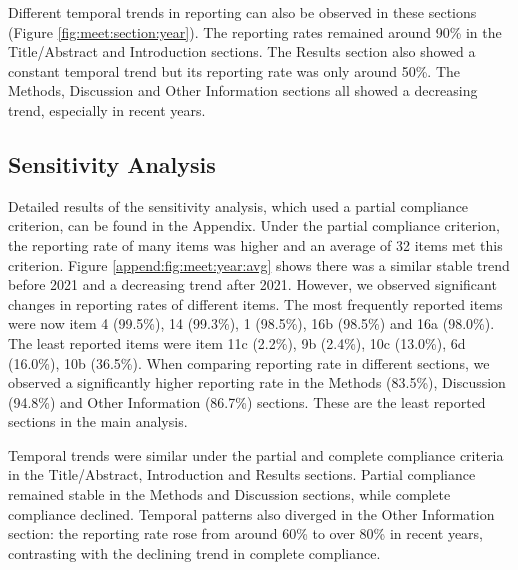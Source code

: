 Different temporal trends in reporting can also be observed in these sections (Figure \ref{fig:meet:section:year}). The reporting rates remained around 90\% in the Title/Abstract and Introduction sections. The Results section also showed a constant temporal trend but its reporting rate was only around 50\%. The Methods, Discussion and Other Information sections all showed a decreasing trend, especially in recent years.



\subsection{Sensitivity Analysis}

Detailed results of the sensitivity analysis, which used a partial compliance criterion, can be found in the Appendix. Under the partial compliance criterion, the reporting rate of many items was higher and an average of 32 items met this criterion. Figure \ref{append:fig:meet:year:avg} shows there was a similar stable trend before 2021 and a decreasing trend after 2021. However, we observed significant changes in reporting rates of different items. The most frequently reported items were now item 4 (99.5\%), 14 (99.3\%), 1 (98.5\%), 16b (98.5\%) and 16a (98.0\%). The least reported items were item 11c (2.2\%), 9b (2.4\%), 10c (13.0\%), 6d (16.0\%), 10b (36.5\%). When comparing reporting rate in different sections, we observed a significantly higher reporting rate in the Methods (83.5\%), Discussion (94.8\%) and Other Information (86.7\%) sections. These are the least reported sections in the main analysis. 

Temporal trends were similar under the partial and complete compliance criteria in the Title/Abstract, Introduction and Results sections. Partial compliance remained stable in the Methods and Discussion sections, while complete compliance declined. Temporal patterns also diverged in the Other Information section: the reporting rate rose from around 60\% to over 80\% in recent years, contrasting with the declining trend in complete compliance. 


